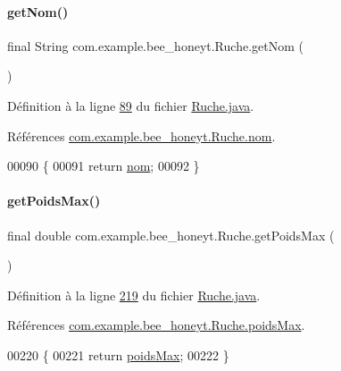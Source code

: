 \paragraph{\texorpdfstring{get\+Nom()}{getNom()}}
{\footnotesize\ttfamily final String com.\+example.\+bee\+\_\+honeyt.\+Ruche.\+get\+Nom (\begin{DoxyParamCaption}{ }\end{DoxyParamCaption})}



Définition à la ligne \hyperlink{_ruche_8java_source_l00089}{89} du fichier \hyperlink{_ruche_8java_source}{Ruche.\+java}.



Références \hyperlink{_ruche_8java_source_l00018}{com.\+example.\+bee\+\_\+honeyt.\+Ruche.\+nom}.


\begin{DoxyCode}
00090     \{
00091         \textcolor{keywordflow}{return} \hyperlink{classcom_1_1example_1_1bee__honeyt_1_1_ruche_ac72094a8a08cf8f485be1456863bc4bd}{nom};
00092     \}
\end{DoxyCode}
\mbox{\label{classcom_1_1example_1_1bee__honeyt_1_1_ruche_a713d2985a0a10983ad16d510decf46a3}} 
\paragraph{\texorpdfstring{get\+Poids\+Max()}{getPoidsMax()}}
{\footnotesize\ttfamily final double com.\+example.\+bee\+\_\+honeyt.\+Ruche.\+get\+Poids\+Max (\begin{DoxyParamCaption}{ }\end{DoxyParamCaption})}



Définition à la ligne \hyperlink{_ruche_8java_source_l00219}{219} du fichier \hyperlink{_ruche_8java_source}{Ruche.\+java}.



Références \hyperlink{_ruche_8java_source_l00034}{com.\+example.\+bee\+\_\+honeyt.\+Ruche.\+poids\+Max}.


\begin{DoxyCode}
00220     \{
00221         \textcolor{keywordflow}{return} \hyperlink{classcom_1_1example_1_1bee__honeyt_1_1_ruche_a5901bf432f6d2de0e5facb8952277cbc}{poidsMax};
00222     \}
\end{DoxyCode}
\mbox{\label{classcom_1_1example_1_1bee__honeyt_1_1_ruche_a71764fe95390c37cce877a60c6a630e3}} 

